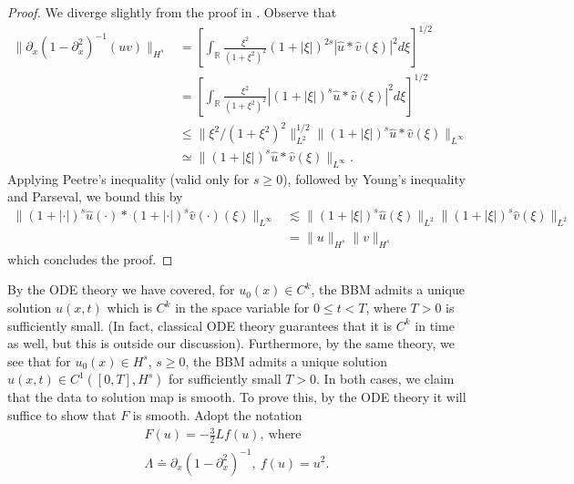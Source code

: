 \documentclass[12pt,reqno]{amsart}
\numberwithin{equation}{section}  %
\newcommand{\rr}{\mathbb{R}}
\newcommand{\wh}{\widehat}
\newcommand{\p}{\partial}
\begin{document}
\begin{proof}
    We diverge slightly from the proof in \cite{Bona_2009_Sharp-well-pose}. Observe that
        \begin{equation*}
        \begin{split}
        \| \p_{x}(1 - \p_{x}^{2})^{-1} (uv) \|_{H^{s}}
        & = \left [ \int_{\rr} \frac{\xi^{2}}{(1 + \xi^{2})^{2}} (1 + |\xi|)^{2s} | \wh{u} * \wh{v}(\xi) |^{2} d \xi \right ]^{1/2}
        \\
        & = \left [ \int_{\rr} \frac{\xi^{2}}{(1 + \xi^{2})^{2}} | (1 + |\xi|)^{s}\wh{u} * \wh{v}(\xi) |^{2} d \xi \right ]^{1/2}
        \\
        & \le \| \xi^{2}/(1 + \xi^{2})^{2} \|_{L^{2}}^{1/2} \| (1 + |\xi|)^{s} \wh{u} * \wh{v}(\xi) \|_{L^{\infty}}
        \\
        & \simeq \| (1 + |\xi|)^{s} \wh{u} * \wh{v}(\xi) \|_{L^{\infty}}.
            \end{split}
\end{equation*}
%
Applying Peetre's inequality (valid only for $s \ge 0$), followed by Young's inequality and Parseval, we bound this by
%
%
%
%
\begin{equation*}
\begin{split}
    \| (1 + |\cdot| )^{s}\wh{u}(\cdot) * (1 + |\cdot| )^{s}\wh{v}(\cdot)(\xi) \|_{L^{\infty}} 
    & \lesssim \| (1 + |\xi| )^{s}\wh{u}(\xi)\|_{L^{2}} \| (1 + |\xi| )^{s}\wh{v}(\xi) \|_{L^{2}}
    \\
    &  = \| u \|_{H^{s}} \| v \|_{H^{s}}
\end{split}
\end{equation*}
%
%
which concludes the proof.
%
\end{proof}
%
%
%
%
%
%
By the ODE theory we have covered, for $u_{0}(x) \in C^{k}$, the BBM admits a
unique solution $u(x,t)$ which is $C^{k}$ in the space variable for $0\le t <
T$, where $T > 0$ is sufficiently small. (In fact, classical ODE theory
guarantees that it is $C^{k}$ in time as well, but this is outside our
discussion). Furthermore, by the same theory, we see that for $u_{0}(x) \in
H^{s}$, $s \ge 0$, the BBM admits a unique solution $u(x,t) \in C^{1}([0, T],
H^{s})$ for sufficiently small $T > 0$. In both cases, we claim that the data to
solution map is smooth. To prove this, by the ODE theory it will suffice to show
that $F$ is smooth. Adopt
the notation
\begin{gather*}
    F(u) = -\frac{3}{2}Lf(u), \ \text{where} \ 
    \\
    \Lambda \doteq \p_{x}(1 - \p_{x}^{2})^{-1}, \ f(u) = u^{2}.
\end{gather*}
\end{document}
